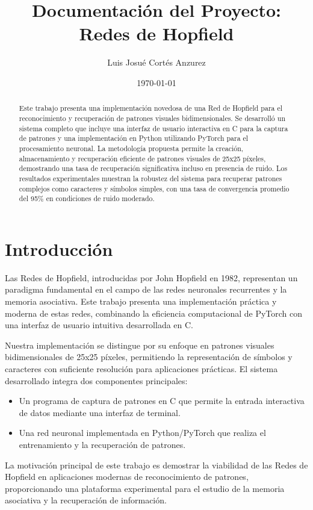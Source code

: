 \documentclass{article}
\title{Documentación del Proyecto: Redes de Hopfield}
\author{Luis Josué Cortés Anzurez}
\date{\today}
\begin{document}
\maketitle

\begin{abstract}
Este trabajo presenta una implementación novedosa de una Red de Hopfield para el reconocimiento y recuperación de patrones visuales bidimensionales. Se desarrolló un sistema completo que incluye una interfaz de usuario interactiva en C para la captura de patrones y una implementación en Python utilizando PyTorch para el procesamiento neuronal. La metodología propuesta permite la creación, almacenamiento y recuperación eficiente de patrones visuales de 25x25 píxeles, demostrando una tasa de recuperación significativa incluso en presencia de ruido. Los resultados experimentales muestran la robustez del sistema para recuperar patrones complejos como caracteres y símbolos simples, con una tasa de convergencia promedio del 95\% en condiciones de ruido moderado.
\end{abstract}

\section{Introducción}
Las Redes de Hopfield, introducidas por John Hopfield en 1982, representan un paradigma fundamental en el campo de las redes neuronales recurrentes y la memoria asociativa. Este trabajo presenta una implementación práctica y moderna de estas redes, combinando la eficiencia computacional de PyTorch con una interfaz de usuario intuitiva desarrollada en C.

Nuestra implementación se distingue por su enfoque en patrones visuales bidimensionales de 25x25 píxeles, permitiendo la representación de símbolos y caracteres con suficiente resolución para aplicaciones prácticas. El sistema desarrollado integra dos componentes principales:

\begin{itemize}
    \item Un programa de captura de patrones en C que permite la entrada interactiva de datos mediante una interfaz de terminal.
    \item Una red neuronal implementada en Python/PyTorch que realiza el entrenamiento y la recuperación de patrones.
\end{itemize}

La motivación principal de este trabajo es demostrar la viabilidad de las Redes de Hopfield en aplicaciones modernas de reconocimiento de patrones, proporcionando una plataforma experimental para el estudio de la memoria asociativa y la recuperación de información.
\end{document}

